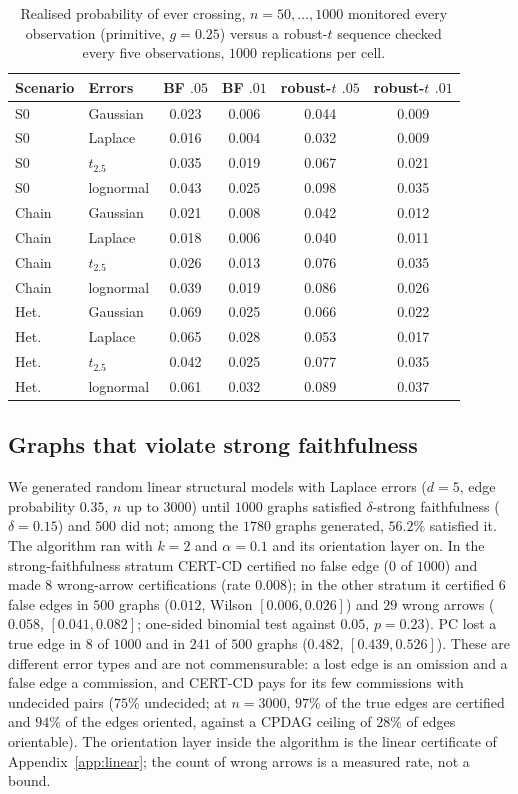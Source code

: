 \begin{table}[t]
\caption{Realised probability of ever crossing, $n=50,\dots,1000$ monitored every
observation (primitive, $g=0.25$) versus a robust-$t$ sequence checked every five
observations, $1000$ replications per cell.}\label{tab:offmodel}
\small
\begin{tabular}{@{}llcccc@{}}
\toprule
Scenario & Errors & BF $.05$ & BF $.01$ & robust-$t$ $.05$ & robust-$t$ $.01$\\
\midrule
S0 & Gaussian & 0.023 & 0.006 & 0.044 & 0.009\\
S0 & Laplace & 0.016 & 0.004 & 0.032 & 0.009\\
S0 & $t_{2.5}$ & 0.035 & 0.019 & 0.067 & 0.021\\
S0 & lognormal & 0.043 & 0.025 & 0.098 & 0.035\\
Chain & Gaussian & 0.021 & 0.008 & 0.042 & 0.012\\
Chain & Laplace & 0.018 & 0.006 & 0.040 & 0.011\\
Chain & $t_{2.5}$ & 0.026 & 0.013 & 0.076 & 0.035\\
Chain & lognormal & 0.039 & 0.019 & 0.086 & 0.026\\
Het. & Gaussian & 0.069 & 0.025 & 0.066 & 0.022\\
Het. & Laplace & 0.065 & 0.028 & 0.053 & 0.017\\
Het. & $t_{2.5}$ & 0.042 & 0.025 & 0.077 & 0.035\\
Het. & lognormal & 0.061 & 0.032 & 0.089 & 0.037\\
\bottomrule
\end{tabular}
\end{table}

\subsection{Graphs that violate strong faithfulness}\label{sec:exp-faith}

We generated random linear structural models with Laplace errors ($d=5$, edge
probability $0.35$, $n$ up to $3000$) until $1000$ graphs satisfied
$\delta$-strong faithfulness ($\delta=0.15$) and $500$ did not; among the $1780$
graphs generated, $56.2\%$ satisfied it. The algorithm ran with $k=2$ and
$\alpha=0.1$ and its orientation layer on. In the strong-faithfulness stratum
CERT-CD certified no false edge ($0$ of $1000$) and made $8$ wrong-arrow
certifications (rate $0.008$); in the other stratum it certified $6$ false edges
in $500$ graphs ($0.012$, Wilson $[0.006,0.026]$) and $29$ wrong arrows ($0.058$,
$[0.041,0.082]$; one-sided binomial test against $0.05$, $p=0.23$). PC lost a true
edge in $8$ of $1000$ and in $241$ of $500$ graphs ($0.482$, $[0.439,0.526]$).
These are different error types and are not commensurable: a lost edge is an
omission and a false edge a commission, and CERT-CD pays for its few commissions
with undecided pairs ($75\%$ undecided; at $n=3000$, $97\%$ of the true edges are
certified and $94\%$ of the edges oriented, against a CPDAG ceiling of $28\%$ of
edges orientable). The orientation layer inside the algorithm is the linear
certificate of Appendix~\ref{app:linear}; the count of wrong arrows is a measured
rate, not a bound.

